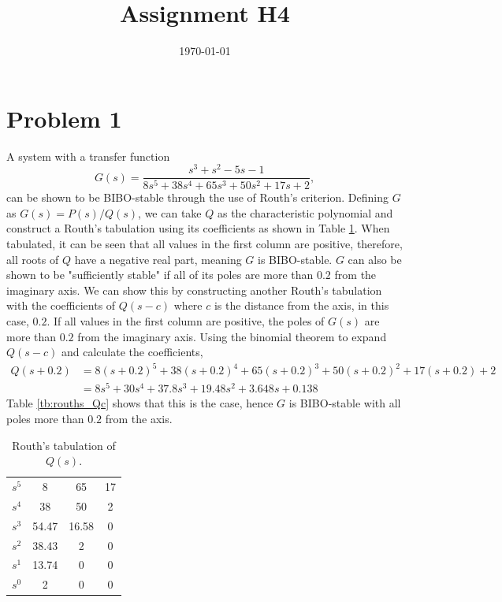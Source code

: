 \documentclass[10pt,a4paper]{article}
\date{\today}
\title{Assignment H4}
\begin{document}
    \header{}
    \section{Problem 1} 
        A system with a transfer function
        \begin{equation}
            G(s) = \frac{s^3 + s^2 - 5s -1}{8s^5 + 38s^4 + 65s^3 + 50s^2 + 17s + 2},
        \end{equation}
        can be shown to be BIBO-stable through the use of Routh's criterion. Defining $G$ as $G(s) = P(s) / Q(s)$, we can take $Q$ as the characteristic polynomial and construct a Routh's tabulation using its coefficients as shown in Table \ref{tb:rouths_Q}. When tabulated, it can be seen that all values in the first column are positive, therefore, all roots of $Q$ have a negative real part, meaning $G$ is BIBO-stable. $G$ can also be shown to be "sufficiently stable" if all of its poles are more than $0.2$ from the imaginary axis. We can show this by constructing another Routh's tabulation with the coefficients of $Q(s - c)$ where $c$ is the distance from the axis, in this case, $0.2$. If all values in the first column are positive, the poles of $G(s)$ are more than $0.2$ from the imaginary axis. Using the binomial theorem to expand $Q(s-c)$ and calculate the coefficients, 
        \begin{align}
            Q(s + 0.2) &= 8(s + 0.2)^5 + 38(s + 0.2)^4 + 65(s + 0.2)^3 + 50(s + 0.2)^2 + 17(s + 0.2) + 2 \\
            &= 8s^5 + 30s^4 + 37.8s^3 + 19.48s^2 + 3.648s + 0.138
        \end{align}
        Table \ref{tb:rouths_Qc} shows that this is the case, hence $G$ is BIBO-stable with all poles more than $0.2$ from the axis.
        \begin{table}[h]
            \centering
            \begin{tabular}{ c | c c c}
                $s^5$ & 8     & 65    & 17 \\
                $s^4$ & 38    & 50    & 2  \\
                $s^3$ & 54.47 & 16.58 & 0  \\
                $s^2$ & 38.43 & 2     & 0  \\
                $s^1$ & 13.74 & 0     & 0  \\
                $s^0$ & 2     & 0     & 0             
            \end{tabular}
            \caption{Routh's tabulation of $Q(s)$.}
            \label{tb:rouths_Q}
        \end{table}
\end{document}
